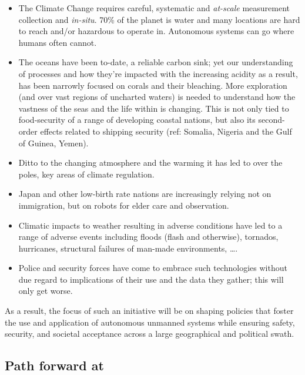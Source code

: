 \documentclass[11pt,letterpaper]{article}
\begin{document}
\begin{itemize}

\item The Climate Change requires careful, systematic and
  \emph{at-scale} measurement collection and \emph{in-situ}. 70\% of
  the planet is water and many locations are hard to reach and/or
  hazardous to operate in. Autonomous systems can go where humans
  often cannot.

\item The oceans have been to-date, a reliable carbon sink; yet our
  understanding of processes and how they're impacted with the
  increasing acidity as a result, has been narrowly focused on corals
  and their bleaching. More exploration (and over vast regions of
  uncharted waters) is needed to understand how the vastness of the
  seas and the life within is changing. This is not only tied to
  food-security of a range of developing coastal nations, but also its
  second-order effects related to shipping security (ref: Somalia,
  Nigeria and the Gulf of Guinea, Yemen).

\item Ditto to the changing atmosphere and the warming it has led to
  over the poles, key areas of climate regulation.

\item Japan and other low-birth rate nations are increasingly relying
  not on immigration, but on robots for elder care and observation. 

\item Climatic impacts to weather resulting in adverse conditions have
  led to a range of adverse events including floods (flash and
  otherwise), tornados, hurricanes, structural failures of man-made
  environments, \ldots.

\item Police and security forces have come to embrace such
  technologies without due regard to implications of their use and the
  data they gather; this will only get worse.


\end{itemize}

As a result, the focus of such an initiative will be on shaping
policies that foster the use and application of autonomous unmanned
systems while ensuring safety, security, and societal acceptance
across a large geographical and political swath.


\subsection{Path forward at \org}
\end{document}
